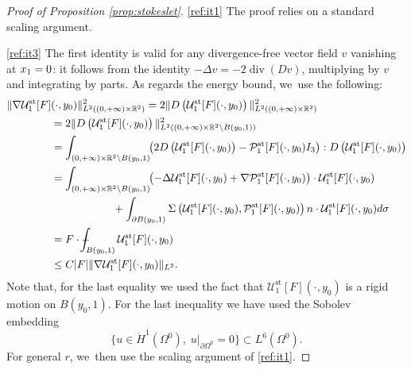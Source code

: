 \documentclass[JEP,XML,SOM,Unicode,NoEqCountersInSection,published]{cedram}
\newcommand{\st}{\mathrm{st}}
\def\Xint#1{\mathchoice
{\XXint\displaystyle\textstyle{#1}}%
{\XXint\textstyle\scriptstyle{#1}}%
{\XXint\scriptstyle\scriptscriptstyle{#1}}%
{\XXint\scriptscriptstyle\scriptscriptstyle{#1}}%
\!\int}
\def\XXint#1#2#3{{\setbox0=\hbox{$#1{#2#3}{\int}$ }
\vcenter{\hbox{$#2#3$ }}\kern-.6\wd0}}
\def\dashint{\Xint-}
\renewcommand{\div}{\operatorname{div}}
\theoremstyle{plain}
\theoremstyle{definition}
\let\pa\partial
\newcommand{\R}{\mathbb{R}}
\begin{document}
\skpt
\begin{proof}[Proof of Proposition \ref{prop:stokeslet}]
\eqref{ref:it1} The proof relies on a standard scaling argument.

\eqref{ref:it3}
The first identity is valid for any divergence-free vector field $v$ vanishing at $x_1 =\nobreak 0$: it follows from the identity $-\Delta v = -2 \div(Dv)$, multiplying by $v$ and integrating by parts. As regards the energy bound, we~use the following:
\begin{align*}
\|\nabla \mathcal{U}^{\st}_1[F]&(\cdot,y_0)\|_{L^2((0,+\infty)\times \R^2)}^2=2\|D\left(\mathcal{U}^{\st}_1[F](\cdot,y_0)\right) \|_{L^2((0,+\infty)\times \R^2)}^2\\
&=2\|D \left(\mathcal{U}^{\st}_1[F](\cdot,y_0) \right) \|_{L^2((0,+\infty)\times \R^2 \setminus B(y_0,1))}^2\\
&= \int_{(0,+\infty)\times \R^2 \setminus B(y_0,1)}\!\! \left(2D\left(\mathcal{U}^{\st}_1[F](\cdot,y_0)\right)- \mathcal{P}^{\st}_1[F](\cdot,y_0) I_3\right) : D\left(\mathcal{U}^{\st}_1[F](\cdot,y_0)\right)\\
&= \int_{(0,+\infty)\times \R^2 \setminus B(y_0,1)}\!\! \left(- \Delta \mathcal{U}^{\st}_1[F](\cdot,y_0)+ \nabla \mathcal{P}^{\st}_1[F](\cdot,y_0)\right) \cdot \mathcal{U}^{\st}_1[F](\cdot,y_0)\\
&\hspace*{2cm}+
\int_{\partial B(y_0,1)} \Sigma\left (\mathcal{U}^{\st}_1[F](\cdot,y_0),\mathcal{P}^{\st}_1[F](\cdot,y_0)\right)n \cdot \mathcal{U}^{\st}_1[F](\cdot,y_0) d \sigma\\
&=F \cdot \dashint_{B(y_0,1)} \mathcal{U}^{\st}_1[F](\cdot,y_0) \\
&\leq C |F| \| \nabla \mathcal{U}^{\st}_1[F](\cdot,y_0) \|_{L^2}.
\end{align*}
Note that, for the last equality we used the fact that $\mathcal{U}^{\st}_1[F](\cdot,y_0)$ is a rigid motion on $B(y_0,1)$. For the last inequality we have used the Sobolev embedding
\[
\{ u \in \dot{H}^1(\Omega^0), \; u\vert_{\pa \Omega^0}= 0 \} \subset L^6(\Omega^0).
\]
For general $r$, we~then use the scaling argument of \eqref{ref:it1}.


\end{proof}
\end{document}
